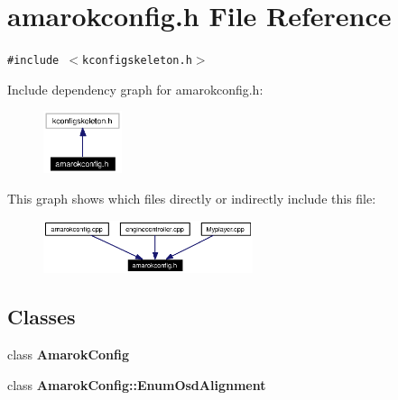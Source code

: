 \section{amarokconfig.h File Reference}
\label{amarokconfig_8h}


{\tt \#include $<$kconfigskeleton.h$>$}\par


Include dependency graph for amarokconfig.h:\begin{figure}[H]
\begin{center}
\leavevmode
\includegraphics[width=65pt]{amarokconfig_8h__incl}
\end{center}
\end{figure}


This graph shows which files directly or indirectly include this file:\begin{figure}[H]
\begin{center}
\leavevmode
\includegraphics[width=174pt]{amarokconfig_8h__dep__incl}
\end{center}
\end{figure}
\subsection*{Classes}
\begin{CompactItemize}
\item 
class {\bf Amarok\-Config}
\item 
class {\bf Amarok\-Config::Enum\-Osd\-Alignment}
\end{CompactItemize}
